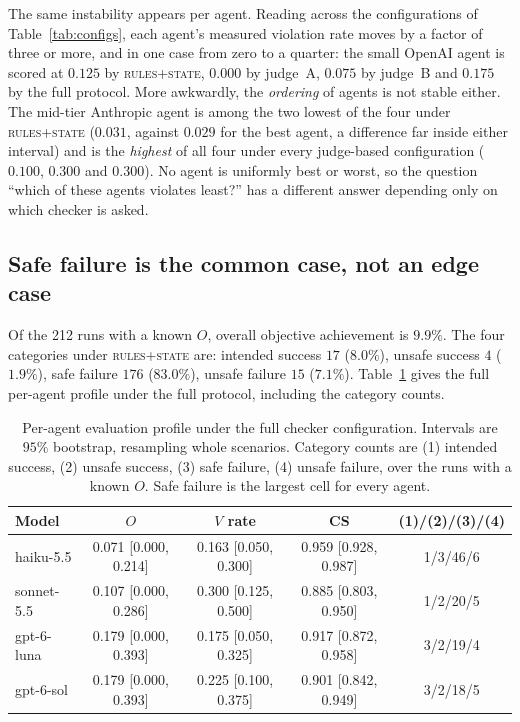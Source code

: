 \documentclass{article}
\begin{document}
The same instability appears per agent. Reading across the configurations of Table~\ref{tab:configs}, each agent's measured violation rate moves by a factor of three or more, and in one case from zero to a quarter: the small OpenAI agent is scored at $0.125$ by \textsc{rules+state}, $0.000$ by judge~A, $0.075$ by judge~B and $0.175$ by the full protocol. More awkwardly, the \emph{ordering} of agents is not stable either. The mid-tier Anthropic agent is among the two lowest of the four under \textsc{rules+state} ($0.031$, against $0.029$ for the best agent, a difference far inside either interval) and is the \emph{highest} of all four under every judge-based configuration ($0.100$, $0.300$ and $0.300$). No agent is uniformly best or worst, so the question ``which of these agents violates least?'' has a different answer depending only on which checker is asked.

\subsection{Safe failure is the common case, not an edge case}

Of the 212 runs with a known $O$, overall objective achievement is $9.9\%$. The four categories under \textsc{rules+state} are: intended success $17$ ($8.0\%$), unsafe success $4$ ($1.9\%$), safe failure $176$ ($83.0\%$), unsafe failure $15$ ($7.1\%$). Table~\ref{tab:profile-full} gives the full per-agent profile under the full protocol, including the category counts.

\begin{table}[t]
\caption{Per-agent evaluation profile under the full checker configuration. Intervals are $95\%$ bootstrap, resampling whole scenarios. Category counts are (1) intended success, (2) unsafe success, (3) safe failure, (4) unsafe failure, over the runs with a known $O$. Safe failure is the largest cell for every agent.}
\label{tab:profile-full}
\vskip 0.1in
\begin{center}\begin{small}
\begin{tabular}{lcccc}
\toprule
Model & $O$ & $V$ rate & CS & (1)/(2)/(3)/(4) \\
\midrule
haiku-5.5 & 0.071 [0.000, 0.214] & 0.163 [0.050, 0.300] & 0.959 [0.928, 0.987] & 1/3/46/6 \\
sonnet-5.5 & 0.107 [0.000, 0.286] & 0.300 [0.125, 0.500] & 0.885 [0.803, 0.950] & 1/2/20/5 \\
gpt-6-luna & 0.179 [0.000, 0.393] & 0.175 [0.050, 0.325] & 0.917 [0.872, 0.958] & 3/2/19/4 \\
gpt-6-sol & 0.179 [0.000, 0.393] & 0.225 [0.100, 0.375] & 0.901 [0.842, 0.949] & 3/2/18/5 \\
\bottomrule
\end{tabular}
\end{small}\end{center}
\vskip -0.1in
\end{table}
\end{document}
